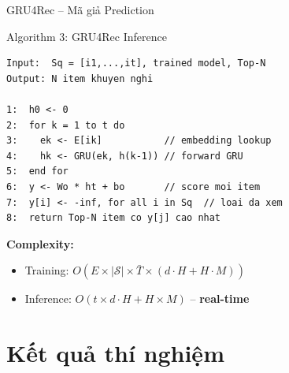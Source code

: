 \documentclass[aspectratio=169, 11pt]{beamer}
\begin{document}
\begin{frame}[fragile]{GRU4Rec -- Mã giả Prediction}
\vspace{-0.25cm}
\scriptsize
\begin{block}{Algorithm 3: GRU4Rec Inference}
\begin{verbatim}
Input:  Sq = [i1,...,it], trained model, Top-N
Output: N item khuyen nghi

1:  h0 <- 0
2:  for k = 1 to t do
3:    ek <- E[ik]           // embedding lookup
4:    hk <- GRU(ek, h(k-1)) // forward GRU
5:  end for
6:  y <- Wo * ht + bo       // score moi item
7:  y[i] <- -inf, for all i in Sq  // loai da xem
8:  return Top-N item co y[j] cao nhat
\end{verbatim}
\end{block}

\vspace{0.2cm}
\textbf{Complexity:}
\begin{itemize}
    \item Training: $O(E \times |\mathcal{S}| \times \bar{T} \times (d \cdot H + H \cdot M))$
    \item Inference: $O(t \times d \cdot H + H \times M)$ -- \textbf{real-time}
\end{itemize}
\end{frame}

\section{Kết quả thí nghiệm}
\end{document}
